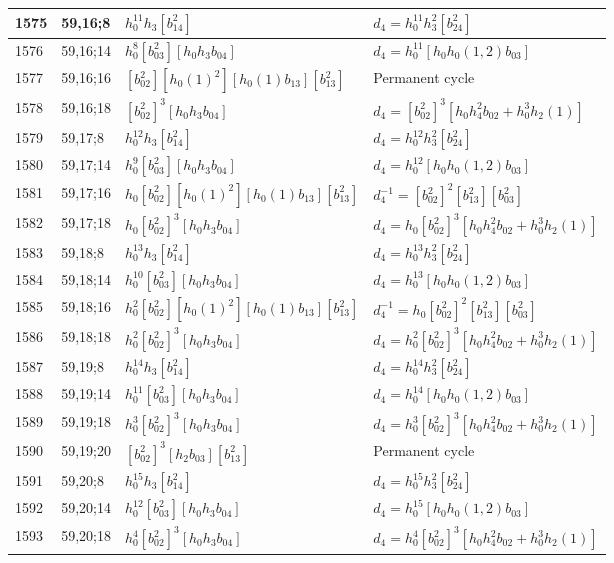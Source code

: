 \documentclass{article}
\begin{document}
\begin{longtable}{|l|l|>{\raggedright\arraybackslash}p{6cm}|>{\raggedright\arraybackslash}p{6cm}|}
\hline
1575 & 59,16;8 & $h_0^{11}h_3[b_{14}^2]$ &$d_{4}=h_0^{11}h_3^2[b_{24}^2]$\\
\hline
1576 & 59,16;14 & $h_0^8[b_{03}^2][h_0h_3b_{04}]$ &$d_{4}=h_0^{11}[h_0h_0(1, 2)b_{03}]$\\
\hline
1577 & 59,16;16 & $[b_{02}^2][h_0(1)^2][h_0(1)b_{13}][b_{13}^2]$ & Permanent cycle\\
\hline
1578 & 59,16;18 & $[b_{02}^2]^3[h_0h_3b_{04}]$ &$d_{4}=[b_{02}^2]^3[h_0h_4^2b_{02} + h_0^3h_2(1)]$\\
\hline
1579 & 59,17;8 & $h_0^{12}h_3[b_{14}^2]$ &$d_{4}=h_0^{12}h_3^2[b_{24}^2]$\\
\hline
1580 & 59,17;14 & $h_0^9[b_{03}^2][h_0h_3b_{04}]$ &$d_{4}=h_0^{12}[h_0h_0(1, 2)b_{03}]$\\
\hline
1581 & 59,17;16 & $h_0[b_{02}^2][h_0(1)^2][h_0(1)b_{13}][b_{13}^2]$ & $d_{4}^{-1}=[b_{02}^2]^2[b_{13}^2][b_{03}^2]$\\
\hline
1582 & 59,17;18 & $h_0[b_{02}^2]^3[h_0h_3b_{04}]$ &$d_{4}=h_0[b_{02}^2]^3[h_0h_4^2b_{02} + h_0^3h_2(1)]$\\
\hline
1583 & 59,18;8 & $h_0^{13}h_3[b_{14}^2]$ &$d_{4}=h_0^{13}h_3^2[b_{24}^2]$\\
\hline
1584 & 59,18;14 & $h_0^{10}[b_{03}^2][h_0h_3b_{04}]$ &$d_{4}=h_0^{13}[h_0h_0(1, 2)b_{03}]$\\
\hline
1585 & 59,18;16 & $h_0^2[b_{02}^2][h_0(1)^2][h_0(1)b_{13}][b_{13}^2]$ & $d_{4}^{-1}=h_0[b_{02}^2]^2[b_{13}^2][b_{03}^2]$\\
\hline
1586 & 59,18;18 & $h_0^2[b_{02}^2]^3[h_0h_3b_{04}]$ &$d_{4}=h_0^2[b_{02}^2]^3[h_0h_4^2b_{02} + h_0^3h_2(1)]$\\
\hline
1587 & 59,19;8 & $h_0^{14}h_3[b_{14}^2]$ &$d_{4}=h_0^{14}h_3^2[b_{24}^2]$\\
\hline
1588 & 59,19;14 & $h_0^{11}[b_{03}^2][h_0h_3b_{04}]$ &$d_{4}=h_0^{14}[h_0h_0(1, 2)b_{03}]$\\
\hline
1589 & 59,19;18 & $h_0^3[b_{02}^2]^3[h_0h_3b_{04}]$ &$d_{4}=h_0^3[b_{02}^2]^3[h_0h_4^2b_{02} + h_0^3h_2(1)]$\\
\hline
1590 & 59,19;20 & $[b_{02}^2]^3[h_2b_{03}][b_{13}^2]$ & Permanent cycle\\
\hline
1591 & 59,20;8 & $h_0^{15}h_3[b_{14}^2]$ &$d_{4}=h_0^{15}h_3^2[b_{24}^2]$\\
\hline
1592 & 59,20;14 & $h_0^{12}[b_{03}^2][h_0h_3b_{04}]$ &$d_{4}=h_0^{15}[h_0h_0(1, 2)b_{03}]$\\
\hline
1593 & 59,20;18 & $h_0^4[b_{02}^2]^3[h_0h_3b_{04}]$ &$d_{4}=h_0^4[b_{02}^2]^3[h_0h_4^2b_{02} + h_0^3h_2(1)]$\\

\end{longtable}
\end{document}
